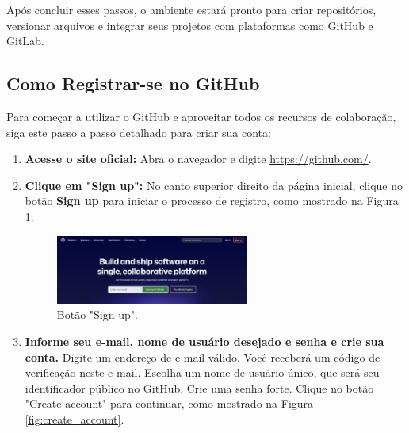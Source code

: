 Após concluir esses passos, o ambiente estará pronto para criar repositórios, versionar arquivos e integrar seus projetos com plataformas como GitHub e GitLab.


\subsection{Como Registrar-se no GitHub}


Para começar a utilizar o GitHub e aproveitar todos os recursos de colaboração, siga este passo a passo detalhado para criar sua conta:

\begin{enumerate}
    \item \textbf{Acesse o site oficial:}  
    Abra o navegador e digite \url{https://github.com/}.

    \item \textbf{Clique em "Sign up":}  
    No canto superior direito da página inicial, clique no botão \textbf{Sign up} para iniciar o processo de registro, como mostrado na Figura \ref{fig:sign_up}.

    \begin{figure}[H]
\centering
\includegraphics[width=0.6\textwidth]{imgs/tutorial_criar_conta_github/1_sign_up.png}
\caption{Botão "Sign up".}
\label{fig:sign_up}
\end{figure}

    \item \textbf{Informe seu e-mail, nome de usuário desejado e senha e crie sua conta.}  
    Digite um endereço de e-mail válido. Você receberá um código de verificação neste e-mail. Escolha um nome de usuário único, que será seu identificador público no GitHub. Crie uma senha forte. Clique no botão "Create account" para continuar, como mostrado na Figura \ref{fig:create_account}.
    

\end{enumerate}
